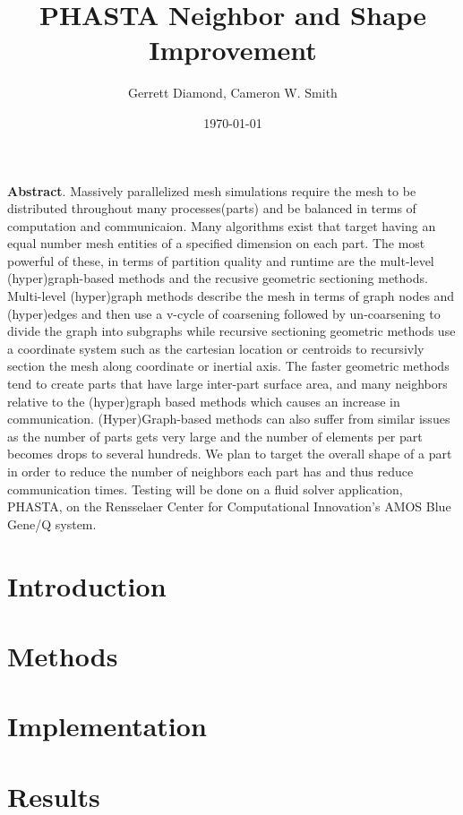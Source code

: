 \documentclass[a4paper]{article}
\title{PHASTA Neighbor and Shape Improvement}
\author{Gerrett Diamond, Cameron W. Smith}
\date{\today}
\begin{document}
\maketitle

\textbf{Abstract}. Massively parallelized mesh simulations require the mesh to be distributed throughout many processes(parts) and be balanced in terms of computation and communicaion. Many algorithms exist that target having an equal number mesh entities of a specified dimension on each part. The most powerful of these, in terms of partition quality and runtime are the mult-level (hyper)graph-based methods and the recusive geometric sectioning methods.  Multi-level (hyper)graph methods describe the mesh in terms of graph nodes and (hyper)edges and then use a v-cycle of coarsening followed by un-coarsening to divide the graph into subgraphs while recursive sectioning geometric methods use a coordinate system such as the cartesian location or centroids to recursivly section the mesh along coordinate or inertial axis. The faster geometric methods tend to create parts that have large inter-part surface area, and many neighbors relative to the (hyper)graph based methods which causes an increase in communication. (Hyper)Graph-based methods can also suffer from similar issues as the number of parts gets very large and the number of elements per part becomes drops to several hundreds.  We plan to target the overall shape of a part in order to reduce the number of neighbors each part has and thus reduce communication times. Testing will be done on a fluid solver application, PHASTA, on the Rensselaer Center for Computational Innovation's AMOS Blue Gene/Q system.
 
\section{Introduction}

\section{Methods}


\section{Implementation}

\section{Results}

\newpage


\end{document}
